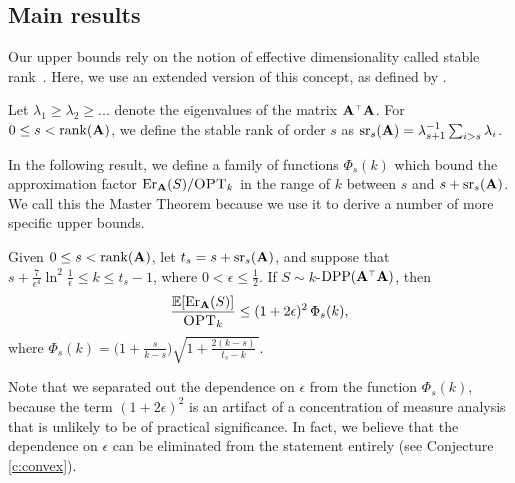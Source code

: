 \documentclass{article}
\begin{document}
\subsection{Main results}
Our upper bounds rely on the notion of effective dimensionality called
stable rank~\citep{ridge-leverage-scores}. Here, we use an extended version of this concept, as
defined by \citet{BLLT19_TR}.
\begin{definition}
Let $\lambda_1\geq \lambda_2\geq ...$ denote the eigenvalues of the
matrix $\A^\top\A$. For  $0\leq s<\mathrm{rank}(\mathbf A)$, we define the stable
rank of order $s$ as ${\mathrm{sr}}_s(\mathbf A) = \lambda_{s+1}^{-1}\sum_{i>s}\lambda_i$.
\end{definition}
In the following result, we define a family of functions $\Phi_s(k)$ which
bound the approximation factor $\mathrm{Er}_\mathbf A(S)/{\textsc{OPT}_k}$ in the range of $k$ between $s$ and
$s+{\mathrm{sr}}_s(\mathbf A)$. We call this the Master Theorem because we use it to derive
a number of more specific upper bounds.
\begin{theorem}\label{t:upper}
Given $0\leq s<\mathrm{rank}(\mathbf A) $, let  $t_s = s+{\mathrm{sr}}_s(\mathbf A)$,
and suppose that $s+ \frac7{\epsilon^4}\ln^2\!\frac1\epsilon \leq k\leq t_s-1$,
where $0<\epsilon\leq\frac12$. If $S\sim k$-$\DPP(\A^\top\A)$, then
\begin{align*}
  \frac{\mathbb E[\mathrm{Er}_\mathbf A(S)]}{{\textsc{OPT}_k}}\leq (1+2\epsilon)^2\,\Phi_{s}(k),
\end{align*}
where  $\Phi_s(k)=\big(1+\frac{s}{k-s}\big)\sqrt{1 + \frac{2(k-s)}{t_s-k}\,}$.
\end{theorem}
Note that we separated out the dependence on $\epsilon$ from the function
$\Phi_s(k)$, because the term $(1+2\epsilon)^2$ is an artifact of a
concentration of measure analysis that is unlikely to be of practical
significance. In fact, we believe that the dependence on $\epsilon$
can be eliminated from the statement entirely (see
Conjecture \ref{c:convex}). 
\end{document}

